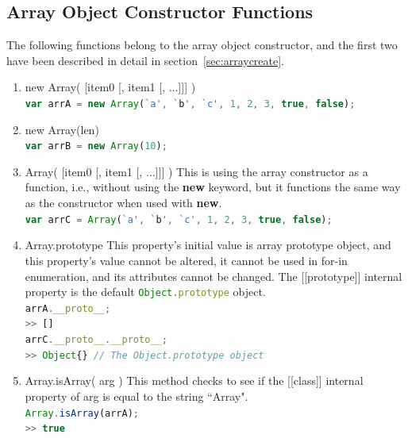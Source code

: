 \documentclass[a4paper,11pt,twoside]{report}
\def\jsinline{\lstinline[language=JavaScript, basicstyle=\small]}%\end{lstlisting}
\begin{document}
\subsection{Array Object Constructor Functions}
The following functions belong to the array object constructor, and the first two have been described in detail in section~\ref{sec:arraycreate}.
\begin{enumerate}
\item new Array( [item0 [, item1 [, ...]]] )\\
\jsinline|var arrA = new Array(`a', `b', `c', 1, 2, 3, true, false);|
\item new Array(len)\\
\jsinline|var arrB = new Array(10);|
\item Array( [item0 [, item1 [, ...]]] ) \newline
This is using the array constructor as a function, i.e., without using the \textbf{new} keyword, but it functions the same way as the constructor when used with \textbf{new}.\\
\jsinline|var arrC = Array(`a', `b', `c', 1, 2, 3, true, false);|
\item Array.prototype \newline
This property's initial value is array prototype object, and this property's value cannot be altered, it cannot be used in for-in enumeration, and its attributes cannot be changed. The [[prototype]] internal property is the default \jsinline|Object.prototype| object.\\
\jsinline|arrA.__proto__;|\\
\jsinline|>> []|\\
\jsinline|arrC.__proto__.__proto__;| \\
\jsinline|>> Object{} // The Object.prototype object |
\item Array.isArray( arg ) \newline
This method checks to see if the [[class]] internal property of arg is equal to the string ``Array". \\
\jsinline|Array.isArray(arrA);| \\
\jsinline|>> true|
\end{enumerate}
\end{document}
